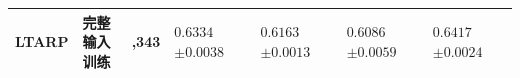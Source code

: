 \begin{table}[H]
\begin{tabularx}{\textwidth}{@{}>{\raggedright\arraybackslash}p{2.0cm}>{\centering\arraybackslash}p{2.5cm}>{\centering\arraybackslash}p{2.1cm}*{4}{>{\centering\arraybackslash}X}@{}}
\addlinespace\midrule
LTARP & \shortstack{完整输入\\训练} & 164,343 & \shortstack{$0.6334$\\$\pm0.0038$} & \shortstack{$0.6163$\\$\pm0.0013$} & \shortstack{$0.6086$\\$\pm0.0059$} & \shortstack{$0.6417$\\$\pm0.0024$}\\
\bottomrule
\end{tabularx}
\end{table}